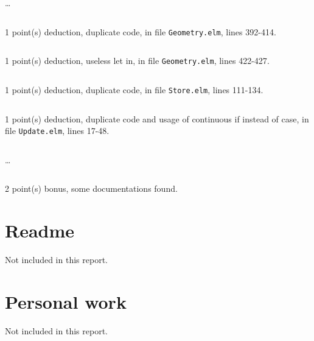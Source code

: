 \documentclass{article}
\begin{document}
\dots

\inputminted[firstline=218,lastline=227]{elm}{Geometry.elm}

1 point(s) {\color{red}deduction}, duplicate code, in file {\color{blue}\texttt{Geometry.elm}}, lines {\color{blue}392-414}.

\inputminted[firstline=392,lastline=414]{elm}{Geometry.elm}

1 point(s) {\color{red}deduction}, useless let in, in file {\color{blue}\texttt{Geometry.elm}}, lines {\color{blue}422-427}.

\inputminted[firstline=422,lastline=427]{elm}{Geometry.elm}

1 point(s) {\color{red}deduction}, duplicate code, in file {\color{blue}\texttt{Store.elm}}, lines {\color{blue}111-134}.

\inputminted[firstline=111,lastline=134]{elm}{Store.elm}

1 point(s) {\color{red}deduction}, duplicate code and usage of continuous if instead of case, in file {\color{blue}\texttt{Update.elm}}, lines {\color{blue}17-48}.

\inputminted[firstline=17,lastline=26]{elm}{Update.elm}

\dots

\inputminted[firstline=39,lastline=48]{elm}{Update.elm}

2 point(s) {\color{red}bonus}, some documentations found.\medskip



\newpage

\section{Readme}

Not included in this report.

\section{Personal work}

Not included in this report.


\newpage
\end{document}
